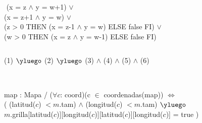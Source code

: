 \begin{Representacion}
$ $\newline
{}%

$ $\newline
{}%
{
(x = z $\land$ y = w+1) $\lor$ \\
(x = z+1 $\land$ y = w) $\lor$ \\
(\IF z > 0 THEN (x = z-1 $\land$ y = w) ELSE false FI) $\lor$ \\
(\IF w > 0 THEN (x = z $\land$ y = w-1) ELSE false FI)
} 


$ $\newline

%
{{(1) $\yluego$ (2) $\yluego$ (3) $\land$ (4) $\land$ (5) $\land$ (6)}} 

$ $\newline
$ $\newline



%
{map : Mapa / ($\forall c$: coord)(c $\in$ coordenadas(map)) $\iff$ \\
( (latitud($c$) $< m$.tam) $\land$ (longitud($c$) $< m$.tam) $\yluego$ \\
\hspace{1cm}	$m$.grilla[latitud($c$)][longitud($c$)][latitud($c$)][longitud($c$)] = true )}%

\end{Representacion}

$ $\newline
$ $\newline

